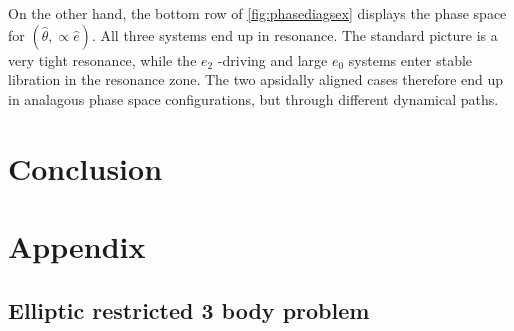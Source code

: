 \documentclass{mnras}
\begin{document}
On the other hand, the bottom row of \ref{fig:phasediagsex} displays the
phase space for \((\hat\theta,\propto \hat e)\).
All three systems end up in resonance. The standard picture is a very tight resonance, while the
\(e_2\) -driving and large \(e_0\) systems enter stable libration in the resonance zone.
The two apsidally aligned cases therefore end up in analagous phase space configurations, but
through different dynamical paths.

\section{Conclusion}
\label{sec:orgb572adf}

\clearpage

\section{Appendix}
\label{sec:orga031258}
\subsection{Elliptic restricted 3 body problem}
\label{sec:org064f05f}



\end{document}
